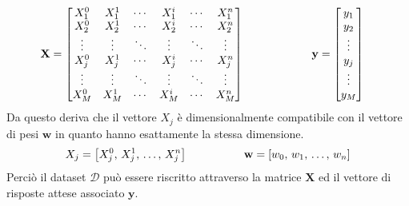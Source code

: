 % 
\begin{gather*}
    \begin{aligned}
        \mathbf{X} &= 
            \begin{bmatrix}
            X_1^0       & X_1^1         & \cdots     & X_1^i         & \cdots     & X_1^n     \\
            X_2^0       & X_2^1         & \cdots     & X_2^i         & \cdots     & X_2^n     \\
            \vdots      & \vdots        & \ddots     & \vdots        & \ddots     & \vdots    \\
            X_j^0       & X_j^1         & \cdots     & X_j^i         & \cdots     & X_j^n     \\
            \vdots      & \vdots        & \ddots     & \vdots        & \ddots     & \vdots    \\
            X_M^0       & X_M^1         & \cdots     & X_M^i         & \cdots     & X_M^n     \\
            \end{bmatrix}
        \hspace{60px}
        \mathbf{y} = 
            \begin{bmatrix}
            y_1 \\ y_2 \\ \vdots \\ y_j \\ \vdots \\ y_M
            \end{bmatrix}
    \end{aligned}
\end{gather*}
% 
\noindent Da questo deriva che il vettore $X_j$ è dimensionalmente compatibile con il vettore di pesi $\mathbf{w}$ in quanto hanno esattamente la stessa dimensione.
% 
\begin{gather*}
    \begin{aligned}
        X_j = \left[ X_j^0,\, X_j^1,\,\dots,\, X_j^n \right]
        \hspace{50px}
        \mathbf{w} = \left[w_0,\, w_1,\, \dots,\, w_n \right]
    \end{aligned}
\end{gather*}
% 
\noindent Perciò il dataset $\mathcal{D}$ può essere riscritto attraverso la matrice $\mathbf{X}$ ed il vettore di risposte attese associato $\mathbf{y}$.
